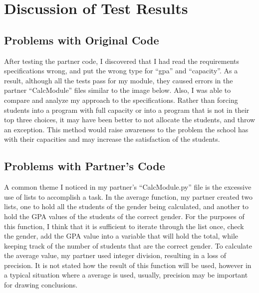 \documentclass[12pt]{article}
\begin{document}
\section{Discussion of Test Results}

\subsection{Problems with Original Code}
After testing the partner code, I discovered that I had read the requirements specifications wrong, and put the wrong type for ``gpa'' and ``capacity''. As a result, although all the tests pass for my module, they caused errors in the partner ``CalcModule'' files similar to the image below. Also, I was able to compare and analyze my approach to the specifications. Rather than forcing students into a program with full capacity or into a program that is not in their top three choices, it may have been better to not allocate the students, and throw an exception. This method would raise awareness to the problem the school has with their capacities and may increase the satisfaction of the students.

\subsection{Problems with Partner's Code}
A common theme I noticed in my partner's ``CalcModule.py'' file is the excessive use of lists to accomplish a task. In the average function, my partner created two lists, one to hold all the students of the gender being calculated, and another to hold the GPA values of the students of the correct gender. For the purposes of this function, I think that it is sufficient to iterate through the list once, check the gender, add the GPA value into a variable that will hold the total, while keeping track of the number of students that are the correct gender. To calculate the average value, my partner used integer division, resulting in a loss of precision. It is not stated how the result of this function will be used, however in a typical situation where a average is used, usually, precision may be important for drawing conclusions.
\end{document}
